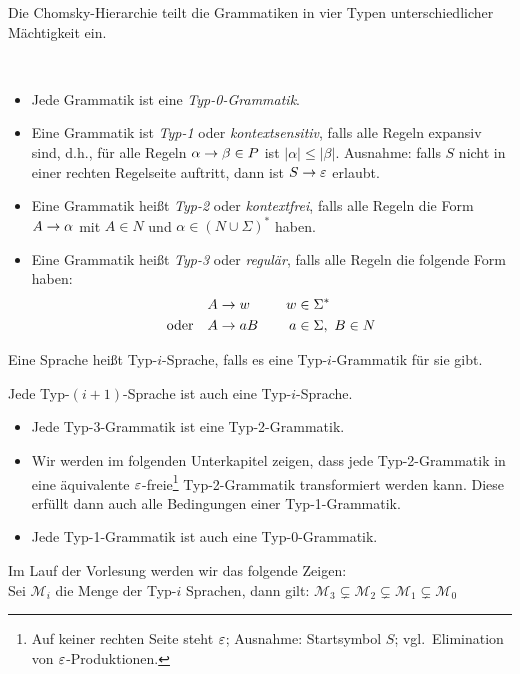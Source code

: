 \bigskip

Die Chomsky-Hierarchie teilt die Grammatiken in vier Typen unterschiedlicher Mächtigkeit ein.
\begin{Def}\
	\begin{itemize}
	\item Jede Grammatik ist eine \emph{Typ-0-Grammatik}.
	\item Eine Grammatik ist \emph{Typ-1} oder
          \emph{kontextsensitiv}, falls alle Regeln expansiv sind,
          d.h., für alle Regeln $\alpha\->\beta\in P$ ist
          $|\alpha|\leq |\beta|$. Ausnahme: falls $S$ nicht in einer
          rechten Regelseite auftritt, dann ist $S\->\Eps$ erlaubt. 
	\item Eine Grammatik heißt \emph{Typ-2} oder \emph{kontextfrei}, falls alle Regeln die Form $A\->\alpha$ mit $A\in N$ und $\alpha\in(N\cup\Sigma)^*$ haben.
	\item Eine Grammatik heißt \emph{Typ-3} oder \emph{regulär}, falls alle Regeln die folgende Form haben:
	\begin{alignat*}{2}
		&A\->w &\quad w&\in\Sigma^*\\
		\text{oder}\quad &A\->aB& a&\in\Sigma,\ B\in N
	\end{alignat*}
	\end{itemize}
	Eine Sprache heißt Typ-$i$-Sprache, falls es eine Typ-$i$-Grammatik für sie gibt.
\end{Def}

\begin{Beobachtung}
	Jede Typ-$(i+1)$-Sprache ist auch eine Typ-$i$-Sprache.
\end{Beobachtung}
\begin{itemize}
 \item Jede Typ-3-Grammatik ist eine Typ-2-Grammatik.\\
 \item Wir werden im folgenden Unterkapitel zeigen, dass jede Typ-2-Grammatik in eine äquivalente $\varepsilon$-freie\footnote{Auf keiner rechten Seite steht $\varepsilon$; Ausnahme: Startsymbol $S$; vgl.\ Elimination von $\varepsilon$-Produktionen.} Typ-2-Grammatik transformiert werden kann.
 Diese erfüllt dann auch alle Bedingungen einer Typ-1-Grammatik.\\
 \item Jede Typ-1-Grammatik ist auch eine Typ-0-Grammatik.
\end{itemize}

Im Lauf der Vorlesung werden wir das folgende Zeigen:\\
Sei $\mathcal{M}_i$ die Menge der Typ-$i$ Sprachen, dann gilt: 
$\mathcal{M}_3 \subsetneq \mathcal{M}_2 \subsetneq\mathcal{M}_1 \subsetneq\mathcal{M}_0$




